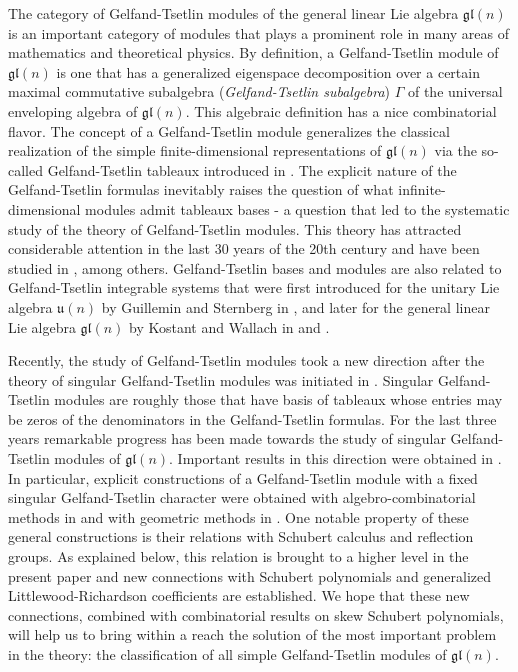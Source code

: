 \documentclass[11pt,fleqn]{amsart}
\begin{document}
The category of Gelfand-Tsetlin modules of the general linear Lie algebra 
$\mathfrak{gl} (n)$ is an important category of modules that plays a prominent 
role in many areas of mathematics and theoretical physics. By definition, a 
Gelfand-Tsetlin module of $\mathfrak{gl} (n)$ is one that has a generalized 
eigenspace decomposition over a certain maximal commutative subalgebra 
(\emph{Gelfand-Tsetlin subalgebra}) $\Gamma$ of the universal enveloping 
algebra of $\mathfrak{gl} (n)$. This algebraic definition has a nice 
combinatorial flavor. The concept of a Gelfand-Tsetlin module generalizes the 
classical realization of the simple finite-dimensional representations of 
$\mathfrak{gl} (n)$ via the so-called Gelfand-Tsetlin tableaux introduced in 
\cite{GT}. The explicit nature of the Gelfand-Tsetlin formulas inevitably 
raises the question of what infinite-dimensional modules admit tableaux bases 
- a question that led to the systematic study of  the theory of 
Gelfand-Tsetlin modules. This theory has attracted considerable attention in 
the last 30 years of the 20th century and have been studied in \cites{
DFO-GT-modules-original, DFO-GT-modules, Maz1, Maz2, m:gtsb, Zh}, among 
others. Gelfand-Tsetlin bases and modules are also related to  Gelfand-Tsetlin 
integrable systems that were first introduced for the unitary Lie algebra 
${\mathfrak u}(n)$ by Guillemin and Sternberg in \cite{GS}, and later for the 
general linear Lie algebra $\mathfrak{gl}(n)$ by Kostant and Wallach in 
\cite{KW-1} and \cite{KW-2}. 


Recently, the study of Gelfand-Tsetlin modules took a new direction after the theory of singular Gelfand-Tsetlin modules was initiated in \cite{FGR-1-singular}. Singular Gelfand-Tsetlin modules are roughly those that have basis of tableaux whose  entries may be zeros of the denominators in the Gelfand-Tsetlin formulas. For the last three years remarkable progress has been made towards the study of singular Gelfand-Tsetlin modules of $\mathfrak{gl}(n)$. Important results in this direction were obtained in \cites{FGR-generic-irreducible, FGR-1-singular, FGR-2-index, Zad-1-sing, 
Vis-geometric-1-singular-GT, Vis-geometric-singular-GT, 
RZ-singular-characters}. In particular, explicit constructions of a Gelfand-Tsetlin module with a fixed singular Gelfand-Tsetlin character were obtained with algebro-combinatorial methods in \cite{RZ-singular-characters} and with geometric methods in \cite{Vis-geometric-singular-GT}.  One notable property of these general constructions is their relations with Schubert calculus and reflection groups. As explained below, this relation  is brought to a higher level in the present paper and new connections with Schubert polynomials and generalized Littlewood-Richardson coefficients are established. We hope that these new connections, combined with combinatorial results on skew Schubert polynomials, will help us to bring within a reach the solution of the most important problem in the theory: the classification of all simple Gelfand-Tsetlin modules of $\mathfrak{gl} (n)$.
\end{document}
